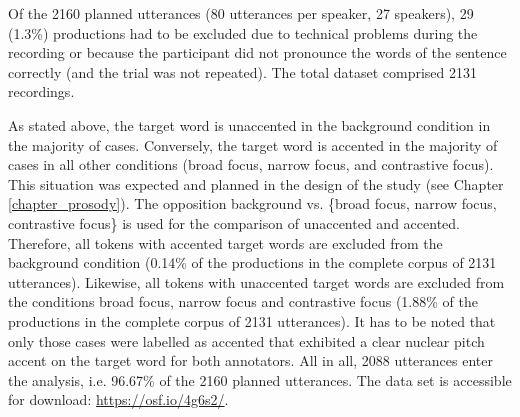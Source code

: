 Of the 2160 planned utterances (80 utterances per speaker, 27 speakers), 29 (1.3\%) productions had to be excluded due to technical problems during the recording or because the participant did not pronounce the words of the sentence correctly (and the trial was not repeated). The total dataset comprised 2131 recordings. 

As stated above, the target word is unaccented in the background condition in the majority of cases. Conversely, the target word is accented in the majority of cases in all other conditions (broad focus, narrow focus, and contrastive focus). This situation was expected and planned in the design of the study (see Chapter \ref{chapter_prosody}). The opposition background vs. \{broad focus, narrow focus, contrastive focus\} is used for the comparison of unaccented and accented. Therefore, all tokens with accented target words are excluded from the background condition (0.14\% of the productions in the complete corpus of 2131 utterances). Likewise, all tokens with unaccented target words are excluded from the conditions broad focus, narrow focus and contrastive focus (1.88\% of the productions in the complete corpus of 2131 utterances). It has to be noted that only those cases were labelled as accented that exhibited a clear nuclear pitch accent on the target word for both annotators. All in all, 2088 utterances enter the analysis, i.e. 96.67\% of the 2160 planned utterances. The data set is accessible for download: \href{https://osf.io/4g6s2/}{https://osf.io/4g6s2/}.

